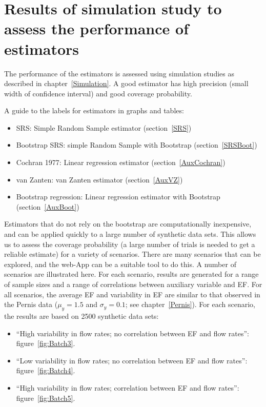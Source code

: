 \clearpage
\section{Results of simulation study to assess the performance of estimators}\label{Results}

The performance of the estimators is assessed using simulation studies as described in chapter~\ref{Simulation}. A good estimator has high precision (small width of confidence interval) and good coverage probability.

A guide to the labels for estimators in graphs and tables:
\begin{itemize}
	\item SRS: Simple Random Sample estimator (section~\ref{SRS})
	\item Bootstrap SRS: simple Random Sample with Bootstrap (section~\ref{SRSBoot})
	\item Cochran 1977: Linear regression estimator (section~\ref{AuxCochran})
	\item van Zanten: van Zanten estimator (section~\ref{AuxVZ})
	\item Bootstrap regression: Linear regression estimator with Bootstrap (section~\ref{AuxBoot})
\end{itemize}

Estimators that do not rely on the bootstrap are computationally inexpensive, and can be applied quickly to a large number of synthetic data sets. This allows us to assess the coverage probability (a large number of trials is needed to get a reliable estimate) for a variety of scenarios. There are many scenarios that can be explored, and the web-App can be a suitable tool to do this. A number of scenarios are illustrated here. For each scenario, results are generated for a range of sample sizes and a range of correlations between auxiliary variable and EF. For all scenarios, the average EF and variability in EF are similar to that observed in the Pernis data ($\mu_y=1.5$ and $\sigma_y=0.1$; see chapter~\ref{Pernis}). For each scenario, the results are based on 2500 synthetic data sets: 
\begin{itemize}
	\item ``High variability in flow rates; no correlation between EF and flow rates'': figure~\ref{fig:Batch3}.
	\item ``Low variability in flow rates; no correlation between EF and flow rates'': figure~\ref{fig:Batch4}.
	\item ``High variability in flow rates; correlation between EF and flow rates'': figure~\ref{fig:Batch5}.
\end{itemize}

